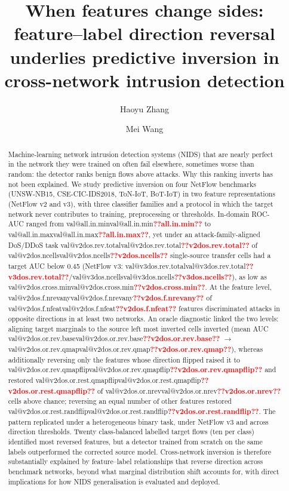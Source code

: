 \documentclass[preprint,12pt]{elsarticle}
\makeatletter
\newcommand{\val}[1]{\ifcsname val@#1\endcsname\csname val@#1\endcsname\else\textbf{\textcolor{red}{??#1??}}\fi}
\makeatother
\begin{document}
\begin{frontmatter}

\title{When features change sides: feature--label direction reversal underlies predictive inversion in cross-network intrusion detection}


\author[stu]{Haoyu Zhang}

\author[ai]{Mei Wang}




\begin{abstract}
Machine-learning network intrusion detection systems (NIDS) that are nearly perfect in the network they were trained on often fail elsewhere, sometimes worse than random: the detector ranks benign flows above attacks. Why this ranking inverts has not been explained. We study predictive inversion on four NetFlow benchmarks (UNSW-NB15, CSE-CIC-IDS2018, ToN-IoT, BoT-IoT) in two feature representations (NetFlow v2 and v3), with three classifier families and a protocol in which the target network never contributes to training, preprocessing or thresholds. In-domain ROC-AUC ranged from \val{all.in.min} to \val{all.in.max}, yet under an attack-family-aligned DoS/DDoS task \val{v2dos.rev.total} of \val{v2dos.ncells} single-source transfer cells had a target AUC below 0.45 (NetFlow v3: \val{v3dos.rev.total}/\val{v3dos.ncells}), as low as \val{v2dos.cross.min}. At the feature level, \val{v2dos.f.nrevany} of \val{v2dos.f.nfeat} features discriminated attacks in opposite directions in at least two networks. An oracle diagnostic linked the two levels: aligning target marginals to the source left most inverted cells inverted (mean AUC \val{v2dos.or.rev.base} $\rightarrow$ \val{v2dos.or.rev.qmap}), whereas additionally reversing only the features whose direction flipped raised it to \val{v2dos.or.rev.qmapflip} and restored \val{v2dos.or.rest.qmapflip} of \val{v2dos.or.nrev} cells above chance; reversing an equal number of other features restored \val{v2dos.or.rest.randflip}. The pattern replicated under a heterogeneous binary task, under NetFlow v3 and across direction thresholds. Twenty class-balanced labelled target flows (ten per class) identified most reversed features, but a detector trained from scratch on the same labels outperformed the corrected source model. Cross-network inversion is therefore substantially explained by feature--label relationships that reverse direction across benchmark networks, beyond what marginal distribution shift accounts for, with direct implications for how NIDS generalisation is evaluated and deployed.
\end{abstract}


\end{frontmatter}
\end{document}
